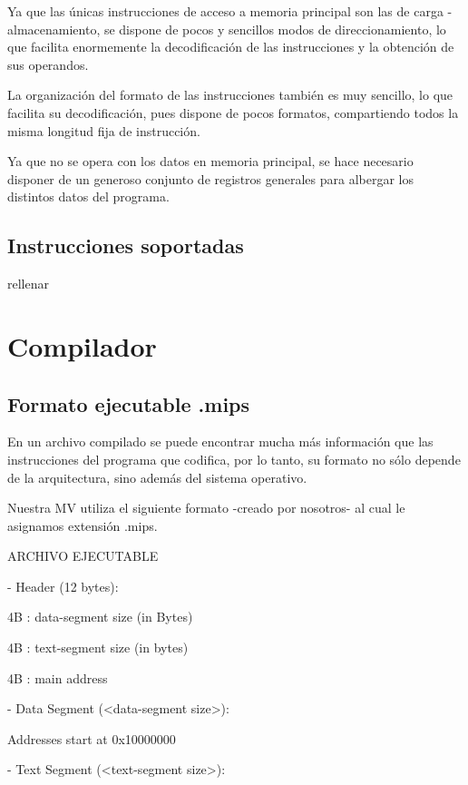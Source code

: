 \documentclass[12pt]{article}
\begin{document}
\item Ya que las únicas instrucciones de acceso a memoria principal son las de carga - almacenamiento,
se dispone de pocos y sencillos modos de direccionamiento, lo que facilita
enormemente la decodificación de las instrucciones y la obtención de sus operandos.
\item La organización del formato de las instrucciones también es muy sencillo, lo que facilita su
decodificación, pues dispone de pocos formatos, compartiendo todos la misma longitud fija
de instrucción.
\item Ya que no se opera con los datos en memoria principal, se hace necesario disponer de un
generoso conjunto de registros generales para albergar los distintos datos del programa.
\fi










\subsection{Instrucciones soportadas}
rellenar
    
\section{Compilador}
\subsection{Formato ejecutable .mips}

En un archivo compilado se puede encontrar mucha más información que las instrucciones del programa que codifica, por lo tanto, su formato no sólo depende de la arquitectura, sino además del sistema operativo.

Nuestra MV utiliza el siguiente formato -creado por nosotros- al cual le asignamos extensión .mips.


ARCHIVO EJECUTABLE

- Header (12 bytes):

    4B : data-segment size (in Bytes)

    4B : text-segment size (in bytes)

    4B : main address

- Data Segment (<data-segment size>):

    Addresses start at 0x10000000

- Text Segment (<text-segment size>):
\end{document}
